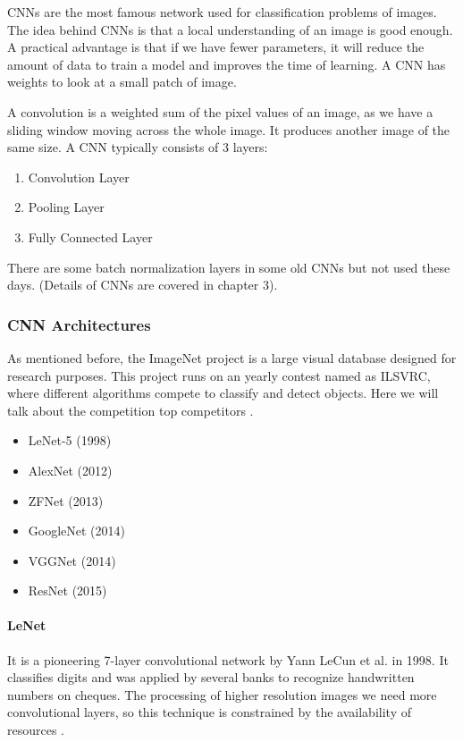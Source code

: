 CNNs are the most famous network used 
for classification problems of images. The idea behind CNNs is that a 
local understanding of an image is good enough. A practical advantage is 
that if we have fewer parameters, it will reduce the amount of data to train 
a model and improves the time of learning. A CNN has weights to look at a small 
patch of image. 

A convolution is a weighted sum of  the pixel values of an image, as 
we have a sliding window moving across the whole image. It produces another 
image of the same size. A CNN typically consists of 3 layers:

\begin{enumerate}
	\item Convolution Layer
	\item Pooling Layer
	\item Fully Connected Layer

\end{enumerate}
There are some batch normalization layers in some old CNNs 
but not used these days. (Details of CNNs are covered in chapter 3).

\subsubsection{CNN Architectures}
As mentioned before, the ImageNet project is a large visual database designed for research purposes. This 
project runs on an yearly contest named as ILSVRC, where different algorithms compete 
to classify and detect objects. Here 
we will talk about the competition top competitors \cite{chap_2_article:9}.
\begin{itemize}
	\item LeNet-5 (1998)
	\item AlexNet (2012)
	\item ZFNet (2013)
	\item GoogleNet (2014)
	\item VGGNet (2014)
	\item ResNet (2015)
\end{itemize}
\paragraph*{LeNet}

It is a pioneering 7-layer convolutional network by 
Yann LeCun et al. in 1998. It classifies digits and was applied by 
several banks to recognize handwritten numbers on cheques. The processing 
of higher resolution images we need more convolutional layers, so this 
technique is constrained by the availability of resources \cite{chap_2_article:10}.

